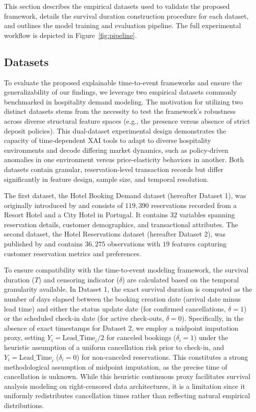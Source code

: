 \documentclass[pdflatex,sn-mathphys-ay]{sn-jnl}%
\theoremstyle{thmstyleone}%
\theoremstyle{thmstyletwo}%
\theoremstyle{thmstylethree}%
\begin{document}
This section describes the empirical datasets used to validate the proposed framework, details the survival duration construction procedure for each dataset, and outlines the model training and evaluation pipeline. The full experimental workflow is depicted in Figure~\ref{fig:pipeline}.

\subsection{Datasets}
To evaluate the proposed explainable time-to-event frameworks and ensure the generalizability of our findings, we leverage two empirical datasets commonly benchmarked in hospitality demand modeling. The motivation for utilizing two distinct datasets stems from the necessity to test the framework's robustness across diverse structural feature spaces (e.g., the presence versus absence of strict deposit policies). This dual-dataset experimental design demonstrates the capacity of time-dependent XAI tools to adapt to diverse hospitality environments and decode differing market dynamics, such as policy-driven anomalies in one environment versus price-elasticity behaviors in another. Both datasets contain granular, reservation-level transaction records but differ significantly in feature design, sample size, and temporal resolution.

The first dataset, the Hotel Booking Demand dataset (hereafter Dataset 1), was originally introduced by \cite{antonio2019data} and consists of $119,390$ reservations recorded from a Resort Hotel and a City Hotel in Portugal. It contains $32$ variables spanning reservation details, customer demographics, and transactional attributes. The second dataset, the Hotel Reservations dataset (hereafter Dataset 2), was published by \cite{raza2023hotel} and contains $36,275$ observations with $19$ features capturing customer reservation metrics and preferences.

To ensure compatibility with the time-to-event modeling framework, the survival duration ($T$) and censoring indicator ($\delta$) are calculated based on the temporal granularity available. In Dataset 1, the exact survival duration is computed as the number of days elapsed between the booking creation date (arrival date minus lead time) and either the status update date (for confirmed cancellations, $\delta = 1$) or the scheduled check-in date (for active check-outs, $\delta = 0$). Specifically, in the absence of exact timestamps for Dataset 2, we employ a midpoint imputation proxy, setting $Y_i = \text{Lead\_Time}_i / 2$ for canceled bookings ($\delta_i = 1$) under the heuristic assumption of a uniform cancellation risk prior to check-in, and $Y_i = \text{Lead\_Time}_i$ ($\delta_i = 0$) for non-canceled reservations. This constitutes a strong methodological assumption of midpoint imputation, as the precise time of cancellation is unknown. While this heuristic continuous proxy facilitates survival analysis modeling on right-censored data architectures, it is a limitation since it uniformly redistributes cancellation times rather than reflecting natural empirical distributions.
\end{document}
